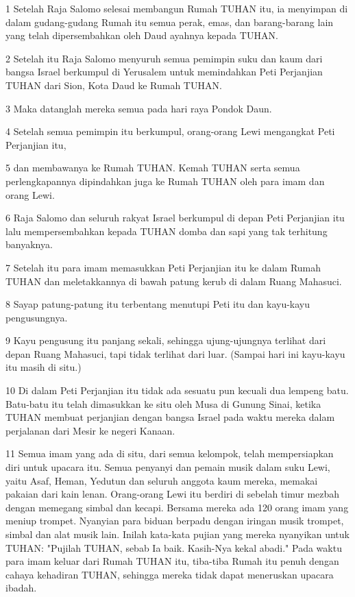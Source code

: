 \par 1 Setelah Raja Salomo selesai membangun Rumah TUHAN itu, ia menyimpan di dalam gudang-gudang Rumah itu semua perak, emas, dan barang-barang lain yang telah dipersembahkan oleh Daud ayahnya kepada TUHAN.
\par 2 Setelah itu Raja Salomo menyuruh semua pemimpin suku dan kaum dari bangsa Israel berkumpul di Yerusalem untuk memindahkan Peti Perjanjian TUHAN dari Sion, Kota Daud ke Rumah TUHAN.
\par 3 Maka datanglah mereka semua pada hari raya Pondok Daun.
\par 4 Setelah semua pemimpin itu berkumpul, orang-orang Lewi mengangkat Peti Perjanjian itu,
\par 5 dan membawanya ke Rumah TUHAN. Kemah TUHAN serta semua perlengkapannya dipindahkan juga ke Rumah TUHAN oleh para imam dan orang Lewi.
\par 6 Raja Salomo dan seluruh rakyat Israel berkumpul di depan Peti Perjanjian itu lalu mempersembahkan kepada TUHAN domba dan sapi yang tak terhitung banyaknya.
\par 7 Setelah itu para imam memasukkan Peti Perjanjian itu ke dalam Rumah TUHAN dan meletakkannya di bawah patung kerub di dalam Ruang Mahasuci.
\par 8 Sayap patung-patung itu terbentang menutupi Peti itu dan kayu-kayu pengusungnya.
\par 9 Kayu pengusung itu panjang sekali, sehingga ujung-ujungnya terlihat dari depan Ruang Mahasuci, tapi tidak terlihat dari luar. (Sampai hari ini kayu-kayu itu masih di situ.)
\par 10 Di dalam Peti Perjanjian itu tidak ada sesuatu pun kecuali dua lempeng batu. Batu-batu itu telah dimasukkan ke situ oleh Musa di Gunung Sinai, ketika TUHAN membuat perjanjian dengan bangsa Israel pada waktu mereka dalam perjalanan dari Mesir ke negeri Kanaan.
\par 11 Semua imam yang ada di situ, dari semua kelompok, telah mempersiapkan diri untuk upacara itu. Semua penyanyi dan pemain musik dalam suku Lewi, yaitu Asaf, Heman, Yedutun dan seluruh anggota kaum mereka, memakai pakaian dari kain lenan. Orang-orang Lewi itu berdiri di sebelah timur mezbah dengan memegang simbal dan kecapi. Bersama mereka ada 120 orang imam yang meniup trompet. Nyanyian para biduan berpadu dengan iringan musik trompet, simbal dan alat musik lain. Inilah kata-kata pujian yang mereka nyanyikan untuk TUHAN: "Pujilah TUHAN, sebab Ia baik. Kasih-Nya kekal abadi." Pada waktu para imam keluar dari Rumah TUHAN itu, tiba-tiba Rumah itu penuh dengan cahaya kehadiran TUHAN, sehingga mereka tidak dapat meneruskan upacara ibadah.

